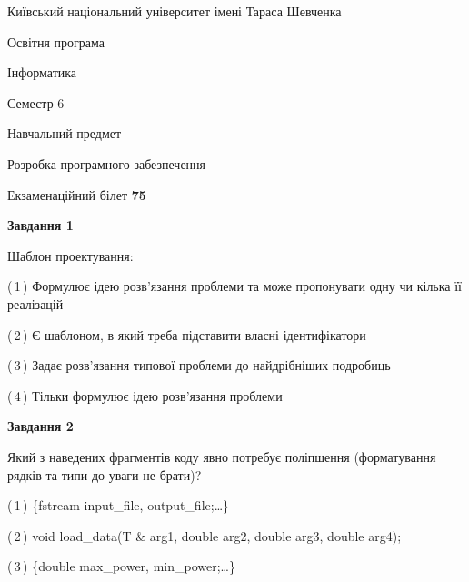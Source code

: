 \documentclass[10pt, ukrainian]{article}
\begin{document}
{{\begin {small}\par
{ \center  Київський національний університет імені Тараса Шевченка \par}
{\parbox {5 cm}{Освітня програма \hfill}{\parbox {7 cm}{Інформатика \hfill}}\parbox {6 cm}{\hfill Семестр 6}}\par
{\parbox {5 cm} {Навчальний предмет \hfill}\parbox {7 cm}{Розробка програмного забезпечення \hfill}\parbox {6cm}{\hfill}\par}\vspace{-7pt} \end{small}}{\center Екзаменаційний білет \No \textbf
{ 75 }\par}}
{
\begin {large}
{\begin {center}\textbf{Завдання 1}\end {center}}\par
Шаблон проектування:\par
\vspace{2mm}



(\,1\,) Формулює ідею розв'язання проблеми та може пропонувати одну чи кілька її реалізацій%



(\,2\,) Є шаблоном, в який треба підставити власні ідентифікатори%



(\,3\,) Задає розв'язання типової проблеми до найдрібніших подробиць%



(\,4\,) Тільки формулює ідею розв'язання проблеми%


{\begin {center}\textbf{Завдання 2}\end {center}}\par
Який з наведених фрагментів коду явно потребує поліпшення (форматування рядків та типи до уваги не брати)?\par
\vspace{2mm}



(\,1\,) \{fstream input\_file, output\_file;…\} %



(\,2\,) void load\_data(T \& arg1, double arg2, double arg3, double arg4); %



(\,3\,) \{double max\_power, min\_power;…\} %




\end{large}}
\end{document}
